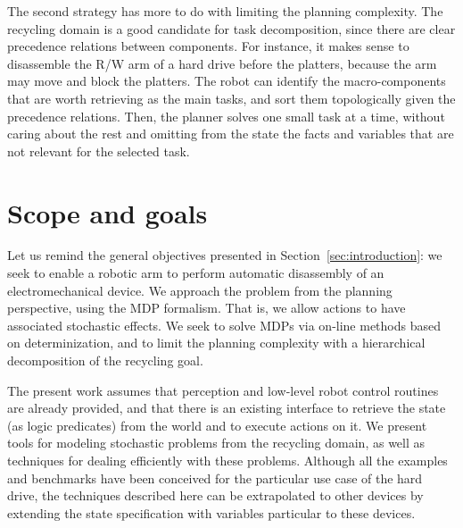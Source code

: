 \documentclass[../root.tex]{subfiles}
\begin{document}
The second strategy has more to do with limiting the planning complexity.
The recycling domain is a good candidate for task decomposition, since
there are clear precedence relations between components. For instance,
it makes sense to disassemble the R/W arm of a hard drive before the
platters, because the arm may move and block the platters. The robot
can identify the macro-components that are worth retrieving as the main
tasks, and sort them topologically given the precedence relations. Then,
the planner solves one small task at a time, without caring about
the rest and omitting from the state the facts and variables that are not
relevant for the selected task.

\section{Scope and goals}

Let us remind the general objectives presented in Section~\ref{sec:introduction}:
we seek to enable a robotic arm to perform automatic disassembly
of an electromechanical device. We approach the problem from
the planning perspective, using
the MDP formalism. That is, we allow actions to have associated stochastic effects.
We seek to solve MDPs via on-line methods based on determinization, and
to limit the planning complexity with a hierarchical decomposition
of the recycling goal.

The present work assumes that perception and low-level robot control
routines are already provided, and that there is an existing interface
to retrieve the state (as logic predicates) from the world and to execute
actions on it.
We present tools for modeling stochastic problems from the recycling
domain, as well as techniques for
dealing efficiently with these problems. Although all the examples and benchmarks
have been conceived for the particular use case of the hard drive,
the techniques described here can be extrapolated to other devices by extending
the state specification with variables particular to these devices.
\end{document}
